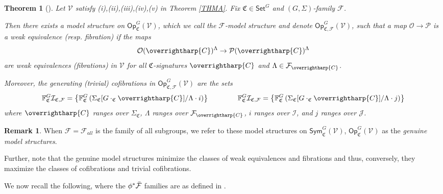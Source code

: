 \documentclass[a4paper,10pt
,draft
]{article}%
\numberwithin{equation}{section}
\numberwithin{figure}{section}
\newtheorem{theorem}[equation]{Theorem}%
\theoremstyle{definition} %
\newtheorem{remark}[equation]{Remark}%
\newcommand{\vect}[1]{\text{\overrightharp{\ensuremath{#1}}}}
\newcommand{\F}{\ensuremath{\mathcal F}}
\newcommand{\V}{\ensuremath{\mathcal V}}
\renewcommand{\O}{\ensuremath{\mathcal O}}
\newcommand{\1}{\ensuremath{\mathbbm 1}}%
\begin{document}
\begin{theorem}
	[{\cite[Thm. \ref{OC-THMI}]{BP_FCOP}}]
	\label{THMIREST}
	Let $\V$ satisfy (i),(ii),(iii),(iv),(v) in Theorem \ref{THMA}.
	Fix $\mathfrak{C} \in \mathsf{Set}^G$
	and $(G,\Sigma)$-family $\F$.
	
	Then there exists a model structure on
	$\mathsf{Op}^G_{\mathfrak{C}}(\mathsf{\V})$,
	which we call the \emph{$\mathcal{F}$-model structure}
	and denote $\mathsf{Op}^G_{\mathfrak{C},\F}(\V)$,
	such that a map
	$\mathcal{O} \to \mathcal{P}$
	is a weak equivalence (resp. fibration) if the maps
	\begin{equation}\label{THMI_EQ}
	\O(\vect{C})^{\Lambda} \to \mathcal{P}(\vect{C})^{\Lambda}
	\end{equation}
	are weak equivalences (fibrations)
	in $\V$ for all $\mathfrak{C}$-signatures $\vect{C}$
	and $\Lambda \in \F_{\vect{C}}$.
	
	Moreover, the generating (trivial) cofibrations in
	$\mathsf{Op}^G_{\mathfrak{C},\F}(\V)$
	are the sets
	\begin{equation}\label{FVGSIGF EQ}
	\mathbb{F}^G_{\mathfrak{C}}\mathcal{I}_{\mathfrak{C},\mathcal{F}}
	=
	\left\{
	\mathbb{F}^G_{\mathfrak{C}}
	\left(\Sigma_{\mathfrak{C}}[G \cdot_{\mathfrak{C}} \vect{C}]/\Lambda \cdot i \right)
	\right\}
	\qquad \qquad
	\mathbb{F}^G_{\mathfrak{C}}\mathcal{I}_{\mathfrak{C},\mathcal{F}}
	=
	\left\{
	\mathbb{F}^G_{\mathfrak{C}}
	\left(\Sigma_{\mathfrak{C}}[G \cdot_{\mathfrak{C}} \vect{C}]/\Lambda \cdot j \right)
	\right\}
	\end{equation}
	where $\vect{C}$ ranges over $\Sigma_{\mathfrak{C}}$,
	$\Lambda$ ranges over $\F_{\vect{C}}$,
	$i$ ranges over $\mathcal{I}$,
	and $j$ ranges over $\mathcal{J}$.
\end{theorem}



\begin{remark}\label{FALLMAXMIN REM}
	When $\mathcal{F}=\mathcal{F}_{all}$ is the family of all subgroups,
	we refer to these model structures on 
	$\mathsf{Sym}^G_{\mathfrak{C}}(\V)$, $\mathsf{Op}^G_{\mathfrak{C}}(\V)$
	as the \emph{genuine model structures}.

	Further, note that the genuine model structures 
	minimize the classes of weak equivalences and fibrations
	and thus, conversely, 
	they maximize the classes of cofibrations and trivial cofibrations.
\end{remark}


We now recall the following,
where the $\phi^{\**} \bar{\F}$ families
are as defined in \cite[Rem. \ref{OC-PULLFAM REM}]{BP_FCOP}.
\end{document}
